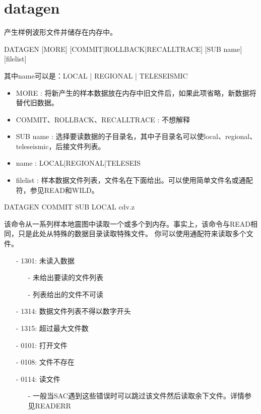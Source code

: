 \section{datagen}
\label{cmd:datagen}

产生样例波形文件并储存在内存中。

DATAGEN [MORE] [COMMIT|ROLLBACK|RECALLTRACE] [SUB name] [filelist]

其中name可以是：LOCAL | REGIONAL | TELESEISMIC

\begin{itemize}
\item MORE : 将新产生的样本数据放在内存中旧文件后，如果此项省略，新数据将替代旧数据。
\item COMMIT、ROLLBACK、RECALLTRACE : 不想解释
\item SUB name : 选择要读数据的子目录名，其中子目录名可以使local、regional、teleseismic，后接文件列表。
\item name : LOCAL|REGIONAL|TELESEIS
\item filelist : 样本数据文件列表，文件名在下面给出。可以使用简单文件名或通配符，参见READ和WILD。
\end{itemize}

DATAGEN COMMIT SUB LOCAL cdv.z

该命令从一系列样本地震图中读取一个或多个到内存。事实上，该命令与READ相同，只是此处从特殊的数据目录读取特殊文件。
你可以使用通配符来读取多个文件。

\begin{itemize}
\item[-]1301: 未读入数据
	\begin{itemize}
  	\item[-]未给出要读的文件列表
	\item[-] 列表给出的文件不可读
	\end{itemize}
\item[-]1314: 数据文件列表不得以数字开头
\item[-]1315: 超过最大文件数
\end{itemize}

\begin{itemize}
\item[-]0101: 打开文件
\item[-]0108: 文件不存在
\item[-]0114: 读文件
	\begin{itemize}
	\item[-]一般当SAC遇到这些错误时可以跳过该文件然后读取余下文件。详情参见READERR
	\end{itemize}
\end{itemize}
  
